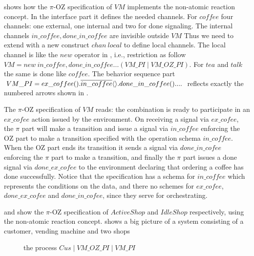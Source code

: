  shows how the $\pi$-OZ specification of $VM$ implements the non-atomic reaction concept. In the interface part it defines the needed channels. For $coffee$ four channels: one external, one internal and two for done signaling. The internal channels $in\_coffee,done\_in\_coffee$ are invisible outside $VM$ Thus we need to extend \oz{} with a new construct $chan\ local$ to define local channels. The local channel is like the $new$ operator in \picalc{}, i.e., restriction as follow $VM = new\ in\_coffee,done\_in\_coffee...(VM\_PI\mid VM\_OZ\_PI)$. For $tea$ and $talk$ the same is done like $coffee$. The behavior sequence part $VM\_PI = ex\_coffee().\overline{in\_coffee}\langle\rangle\\.done\_in\_coffee() .... $ reflects exactly the numbered arrows shown in . 

The $\pi$-OZ specification of $VM$ reads: the combination is ready to participate in an $ex\_cofee$ action issued by the environment. On receiving a signal via $ex\_cofee$, the $\pi$ part will make a transition and issue a signal via $in\_coffee$ enforcing the OZ part to make a transition specified with the operation schema $in\_coffee$. When the OZ part ends its transition it sends a signal via $done\_in\_cofee$ enforcing the $\pi$ part to make a transition, and finally the $\pi$ part issues a done signal via $done\_ex\_cofee$ to the environment declaring that ordering a coffee has done successfully. Notice that the specification has a schema for $in\_coffee$ which represents the conditions on the data, and there no schemes for $ex\_cofee$, $done\_ex\_cofee$ and $done\_in\_cofee$, since they serve for orchestrating.

 and  show the $\pi$-OZ specification of $ActiveShop$ and $IdleShop$ respectively, using the non-atomic reaction concept.  shows a big picture of a system consisting of a customer, vending machine and two shops

\begin{figure}[H]%
\centering
{}%
\caption{the process $Cus \mid VM\_OZ\_PI \mid VM\_PI$}
\label{binary_reactoin}%
\end{figure}

